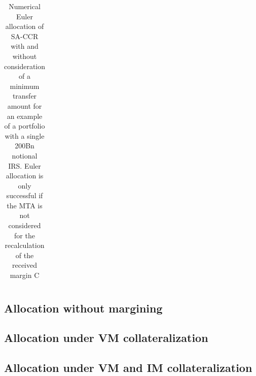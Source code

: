 \documentclass[../Thesis_AHoecherl.tex]{subfiles}
\begin{document}
\begin{table}[htbp]
\begin{tabular}{c|c|c}
            \end{tabular}%
        \caption{Numerical Euler allocation of SA-CCR with and without consideration of a minimum transfer amount for an example of a portfolio with a single 200Bn notional IRS. Euler allocation is only successful if the \gls{MTA} is not considered for the recalculation of the received margin C}
    \end{table}

    \subsection{Allocation without margining}
    \subsection{Allocation under VM collateralization}
    \subsection{Allocation under VM and IM collateralization}
\end{document}
